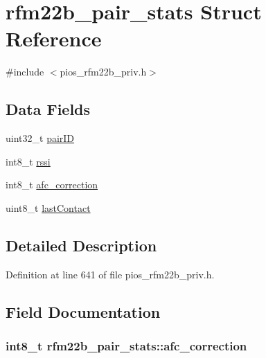\hypertarget{structrfm22b__pair__stats}{\section{rfm22b\-\_\-pair\-\_\-stats \-Struct \-Reference}
\label{structrfm22b__pair__stats}
}


{\ttfamily \#include $<$pios\-\_\-rfm22b\-\_\-priv.\-h$>$}

\subsection*{\-Data \-Fields}
\begin{DoxyCompactItemize}
\item 
uint32\-\_\-t \hyperlink{structrfm22b__pair__stats_aecbce2c6a0ece945bc66e3fc007a25e2}{pair\-I\-D}
\item 
int8\-\_\-t \hyperlink{structrfm22b__pair__stats_a44c32f693c666d5f5e1d0bef314f47d7}{rssi}
\item 
int8\-\_\-t \hyperlink{structrfm22b__pair__stats_a370cbe1c41f8039f09e8f8f30d59591b}{afc\-\_\-correction}
\item 
uint8\-\_\-t \hyperlink{structrfm22b__pair__stats_a54401550bc26e4923636667ba5df8d34}{last\-Contact}
\end{DoxyCompactItemize}


\subsection{\-Detailed \-Description}


\-Definition at line 641 of file pios\-\_\-rfm22b\-\_\-priv.\-h.



\subsection{\-Field \-Documentation}
\hypertarget{structrfm22b__pair__stats_a370cbe1c41f8039f09e8f8f30d59591b}{
\subsubsection[{afc\-\_\-correction}]{\setlength{\rightskip}{0pt plus 5cm}int8\-\_\-t {\bf rfm22b\-\_\-pair\-\_\-stats\-::afc\-\_\-correction}}}\label{structrfm22b__pair__stats_a370cbe1c41f8039f09e8f8f30d59591b}


